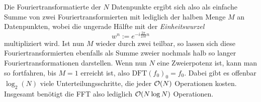 Die Fouriertransformatierte der $N$ Datenpunkte ergibt sich also als
einfache Summe von zwei
Fouriertransformierten mit lediglich der halben Menge $M$ an
Datenpunkten, wobei die ungerade Hälfte mit der \emph{Einheitswurzel}
\begin{equation}
  w^n := e^{-i\frac{2\pi}{2M} n}
\end{equation}
multipliziert wird.  Ist nun $M$ wieder durch zwei teilbar, so lassen
sich diese Fouriertransformierten ebenfalls als Summe zweier nochmals
halb so langer Fouriertransformationen darstellen. Wenn nun $N$ eine
Zweierpotenz ist, kann man so fortfahren, bis $M=1$ erreicht ist, also
$\text{DFT}(f_0)_0 = f_0$. Dabei gibt es offenbar $\log_2(N)$ viele
Unterteilungsschritte, die jeder $\mathcal O(N)$ Operationen kosten. Insgesamt
benötigt die FFT also lediglich $\mathcal O(N\log N)$ Operationen.

